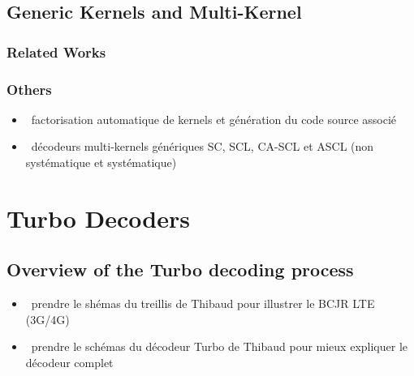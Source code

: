 \subsection{Generic Kernels and Multi-Kernel}

\subsubsection{Related Works}

\subsubsection{Others}

\begin{itemize}
  \item \xmark~factorisation automatique de kernels et génération du code source
    associé
  \item \xmark~décodeurs multi-kernels génériques SC, SCL, CA-SCL et ASCL (non
    systématique et systématique)
\end{itemize}

\section{Turbo Decoders}

\subsection{Overview of the Turbo decoding process}
\label{sec:turbo_overview}

\begin{itemize}
  \item \xmark~prendre le shémas du treillis de Thibaud pour illustrer le BCJR
    LTE (3G/4G)
  \item \xmark~prendre le schémas du décodeur Turbo de Thibaud pour mieux
    expliquer le décodeur complet
\end{itemize}


